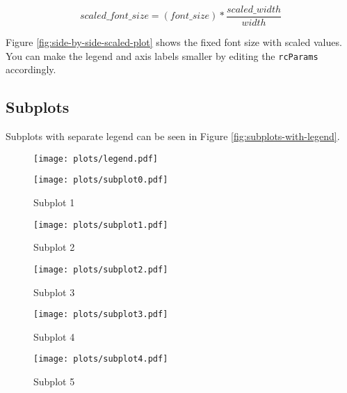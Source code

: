 \documentclass[12pt,twocolumn]{article}
\begin{document}
\begin{equation}
    scaled\_font\_size = (font\_size) * \frac{scaled\_width}{width}
\end{equation}


Figure \ref{fig:side-by-side-scaled-plot} shows the fixed font size with scaled values.
%
You can make the legend and axis labels smaller by editing the \texttt{rcParams} accordingly.



\subsection{Subplots}

Subplots with separate legend can be seen in Figure \ref{fig:subplots-with-legend}.

\begin{figure*}
    \centering
    \begin{subfigure}[b]{0.3\textwidth}
        \centering
        \texttt{[image: plots/legend.pdf]}
    \end{subfigure}


    \begin{subfigure}[b]{0.3\textwidth}
        \centering
        \texttt{[image: plots/subplot0.pdf]}
        \caption{Subplot 1}
    \end{subfigure}
    \begin{subfigure}[b]{0.3\textwidth}
        \centering
        \texttt{[image: plots/subplot1.pdf]}
        \caption{Subplot 2}
    \end{subfigure}
    \begin{subfigure}[b]{0.3\textwidth}
        \centering
        \texttt{[image: plots/subplot2.pdf]}
        \caption{Subplot 3}
    \end{subfigure}
    \begin{subfigure}[b]{0.3\textwidth}
        \centering
        \texttt{[image: plots/subplot3.pdf]}
        \caption{Subplot 4}
    \end{subfigure}
    \begin{subfigure}[b]{0.3\textwidth}
        \centering
        \texttt{[image: plots/subplot4.pdf]}
        \caption{Subplot 5}
    \end{subfigure}
    \caption{Subplots with legend}
    \label{fig:subplots-with-legend}
\end{figure*}

\pagebreak
\end{document}
